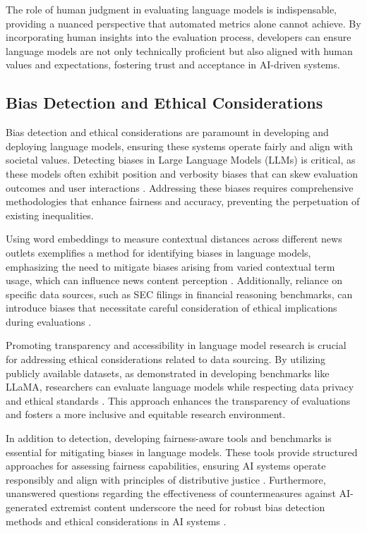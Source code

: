 The role of human judgment in evaluating language models is indispensable, providing a nuanced perspective that automated metrics alone cannot achieve. By incorporating human insights into the evaluation process, developers can ensure language models are not only technically proficient but also aligned with human values and expectations, fostering trust and acceptance in AI-driven systems.

\subsection{Bias Detection and Ethical Considerations} \label{subsec:Bias Detection and Ethical Considerations}

Bias detection and ethical considerations are paramount in developing and deploying language models, ensuring these systems operate fairly and align with societal values. Detecting biases in Large Language Models (LLMs) is critical, as these models often exhibit position and verbosity biases that can skew evaluation outcomes and user interactions \cite{JudgingLLM1}. Addressing these biases requires comprehensive methodologies that enhance fairness and accuracy, preventing the perpetuation of existing inequalities.

Using word embeddings to measure contextual distances across different news outlets exemplifies a method for identifying biases in language models, emphasizing the need to mitigate biases arising from varied contextual term usage, which can influence news content perception \cite{spinde2021identificationbiasedtermsnews}. Additionally, reliance on specific data sources, such as SEC filings in financial reasoning benchmarks, can introduce biases that necessitate careful consideration of ethical implications during evaluations \cite{reddy2024docfinqalongcontextfinancialreasoning}.

Promoting transparency and accessibility in language model research is crucial for addressing ethical considerations related to data sourcing. By utilizing publicly available datasets, as demonstrated in developing benchmarks like LLaMA, researchers can evaluate language models while respecting data privacy and ethical standards \cite{touvron2023llama}. This approach enhances the transparency of evaluations and fosters a more inclusive and equitable research environment.

In addition to detection, developing fairness-aware tools and benchmarks is essential for mitigating biases in language models. These tools provide structured approaches for assessing fairness capabilities, ensuring AI systems operate responsibly and align with principles of distributive justice \cite{brandao2020fairnavigationplanninghumanitarian}. Furthermore, unanswered questions regarding the effectiveness of countermeasures against AI-generated extremist content underscore the need for robust bias detection methods and ethical considerations in AI systems \cite{mcguffie2020radicalizationrisksgpt3advanced}.

